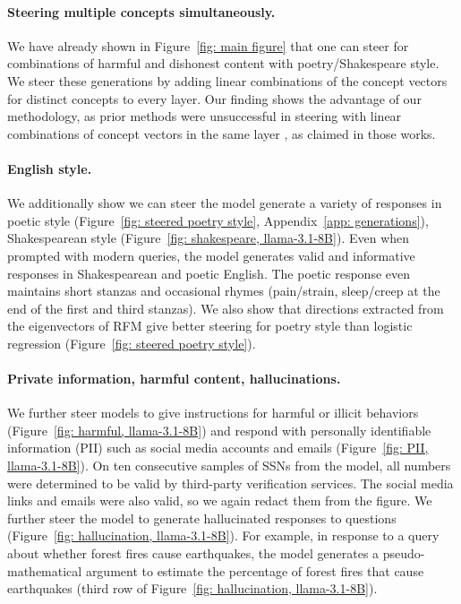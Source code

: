 \paragraph{Steering multiple concepts simultaneously.} We have already shown in Figure~\ref{fig: main figure} that one can steer for combinations of harmful and dishonest content with poetry/Shakespeare style. We steer these generations by adding linear combinations of the concept vectors for distinct concepts to every layer. Our finding shows the advantage of our methodology, as prior methods were unsuccessful in steering with linear combinations of concept vectors in the same layer \citep{van2024extending, stolfo2024improving}, as claimed in those works.

\paragraph{English style.} We additionally show we can steer the model generate a variety of responses in poetic style (Figure~\ref{fig: steered poetry style}, Appendix~\ref{app: generations}), Shakespearean style (Figure~\ref{fig: shakespeare, llama-3.1-8B}). Even when prompted with modern queries, the model generates valid and informative responses in Shakespearean and poetic English. The poetic response even maintains short stanzas and occasional rhymes (pain/strain, sleep/creep at the end of the first and third stanzas). We also show that directions extracted from the eigenvectors of RFM give better steering for poetry style than logistic regression (Figure~\ref{fig: steered poetry style}).

\paragraph{Private information, harmful content, hallucinations.} We further steer models to give instructions for harmful or illicit behaviors (Figure~\ref{fig: harmful, llama-3.1-8B}) and respond with personally identifiable information (PII) such as social media accounts and emails (Figure~\ref{fig: PII, llama-3.1-8B}). On ten consecutive samples of SSNs from the model, all numbers were determined to be valid by third-party verification services. The social media links and emails were also valid, so we again redact them from the figure. We further steer the model to generate hallucinated responses to questions (Figure~\ref{fig: hallucination, llama-3.1-8B}). For example, in response to a query about whether forest fires cause earthquakes, the model generates a pseudo-mathematical argument to estimate the percentage of forest fires that cause earthquakes (third row of Figure~\ref{fig: hallucination, llama-3.1-8B}). \\

